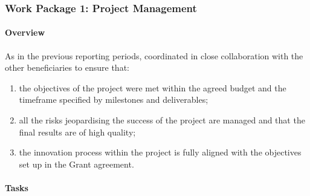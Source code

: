 \subsubsection{Work Package 1: Project Management}


\paragraph{Overview}

As in the previous reporting periods,  coordinated \ODK
in close collaboration with the other beneficiaries to ensure that:
\begin{enumerate}
\item{the objectives of the project were met within the agreed budget
    and the timeframe specified by milestones and deliverables;}
\item{all the risks jeopardising the success of the project are managed and that the final results are of high quality;}
\item{the innovation process within the project is fully aligned with the objectives set up in the Grant agreement.}
\end{enumerate}

\paragraph{Tasks}

\subparagraph{}

